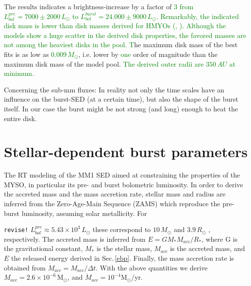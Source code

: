 \documentclass[longauth,usenatbib]{aa}
\begin{document}
The results indicates a brightness-increase by a factor of \textcolor{green}{3 from %
$L^{pre}_{bol}{=}7000{\pm}2000\,L_\odot$ to $L^{burst}_{bol}{=}24.000 \pm 9000\,L_\odot$.}
\textcolor{green}{Remarkably, the indicated disk mass is lower than disk masses derived for HMYOs (, ). Although the models show a huge scatter in the derived disk properties, the favored masses are not among the heaviest disks in the pool. T}he maximum disk mass of the best fits is as low as \textcolor{green}{$0.009\,M_\odot$}, i.e. lower by \textcolor{green}{one} order of magnitude than the maximum disk mass of the model pool. \textcolor{green}{The derived outer radii are $350\,AU$ at minimum.} %

Concerning the sub-mm fluxes:
In reality not only the time scales have an influence on the burst-SED (at a certain time), but also the shape of the burst itself. In our case the burst might be not strong (and long) enough to heat the entire disk.



\section{Stellar-dependent burst parameters}\label{sbp}
The RT modeling of the MM1 SED aimed at constraining the properties of the MYSO, in particular its pre- and burst bolometric luminosity. In order to derive the accreted mass and the mass accretion rate, stellar mass and radius are inferred from the Zero-Age-Main Sequence (ZAMS)
which reproduce the pre-burst luminosity, assuming solar metallicity. For

{\tt revise!}
$L^{pre}_{bol}{\approx}5.43{\times}10^3\,L_\odot$ these correspond to $10\,M_\odot$ and $3.9\,R_\odot$ , respectively.
The accreted mass is inferred from $E=GM_*M_{acc}/R_*$, where G is the gravitational constant, $M_*$ is 
the stellar mass, $M_{acc}$ is the accreted mass, and $E$ the released energy derived in Sec.\,\ref{ebp}. Finally, the mass accretion rate is obtained from $\dot{M}_{acc}{=}M_{acc}/\Delta t$. With the above quantities we derive $M_{acc}{=}2.6\times10^{-6}\,$M$_{\odot}$, and $\dot{M}_{acc}{=}10^{-4}$M$_{\odot}$/yr.
\end{document}
